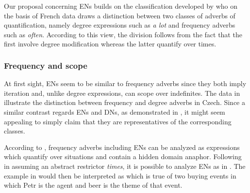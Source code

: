 \documentclass[output=paper,
modfonts,
hidelinks,
newtxmath
]{langscibook}
\begin{document}
Our proposal concerning ENs builds on the classification developed by \cite{doetjes_adverbs_2007} who on the basis of French data draws a distinction between two classes of adverbs of quantification, namely degree expressions such as \textit{a lot} and frequency adverbs such as \textit{often}. According to this view, the division follows from the fact that the first involve degree modification whereas the latter quantify over times. 

\subsubsection{Frequency and scope}\label{frequency-and-scope}

At first sight, ENs seem to be similar to frequency adverbs since they both imply iteration and, unlike degree expressions, can scope over indefinites. The data in  illustrate the distinction between frequency and degree adverbs in Czech. Since a similar contrast regards ENs and DNs, as demonstrated in , it might seem appealing to simply claim that they are representatives of the corresponding classes.

\ea\label{frequency-degree-adverbs} 
\z \z

\ea\label{event-degree-numerals} 
\z \z

\noindent According to \cite{von_fintel_restrictions_1994}, frequency adverbs including ENs can be analyzed as expressions which quantify over situations and contain a hidden domain anaphor. Following \cite{doetjes_adverbs_2007} in assuming an abstract restrictor \textit{times}, it is possible to analyze ENs as in . The example in  would then be interpreted as  which is true of two buying events in which Petr is the agent and beer is the theme of that event.
\end{document}
